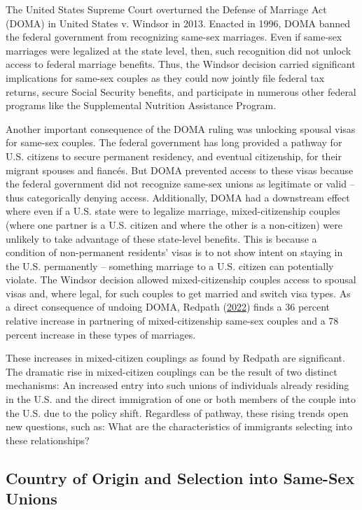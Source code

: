 \documentclass[
  12pt,
]{article}
\begin{document}
The United States Supreme Court overturned the Defense of Marriage Act (DOMA) in United States v. Windsor in 2013. Enacted in 1996, DOMA banned the federal government from recognizing same-sex marriages. Even if same-sex marriages were legalized at the state level, then, such recognition did not unlock access to federal marriage benefits. Thus, the Windsor decision carried significant implications for same-sex couples as they could now jointly file federal tax returns, secure Social Security benefits, and participate in numerous other federal programs like the Supplemental Nutrition Assistance Program.

Another important consequence of the DOMA ruling was unlocking spousal visas for same-sex couples. The federal government has long provided a pathway for U.S. citizens to secure permanent residency, and eventual citizenship, for their migrant spouses and fiancés. But DOMA prevented access to these visas because the federal government did not recognize same-sex unions as legitimate or valid -- thus categorically denying access. Additionally, DOMA had a downstream effect where even if a U.S. state were to legalize marriage, mixed-citizenship couples (where one partner is a U.S. citizen and where the other is a non-citizen) were unlikely to take advantage of these state-level benefits. This is because a condition of non-permanent residents' visas is to not show intent on staying in the U.S. permanently -- something marriage to a U.S. citizen can potentially violate. The Windsor decision allowed mixed-citizenship couples access to spousal visas and, where legal, for such couples to get married and switch visa types. As a direct consequence of undoing DOMA, Redpath (\protect\hyperlink{ref-redpath_2022_spousal}{2022}) finds a 36 percent relative increase in partnering of mixed-citizenship same-sex couples and a 78 percent increase in these types of marriages.

These increases in mixed-citizen couplings as found by Redpath are significant. The dramatic rise in mixed-citizen couplings can be the result of two distinct mechanisms: An increased entry into such unions of individuals already residing in the U.S. and the direct immigration of one or both members of the couple into the U.S. due to the policy shift. Regardless of pathway, these rising trends open new questions, such as: What are the characteristics of immigrants selecting into these relationships?

\hypertarget{country-of-origin-and-selection-into-same-sex-unions}{%
\subsection{Country of Origin and Selection into Same-Sex Unions}\label{country-of-origin-and-selection-into-same-sex-unions}}
\end{document}
